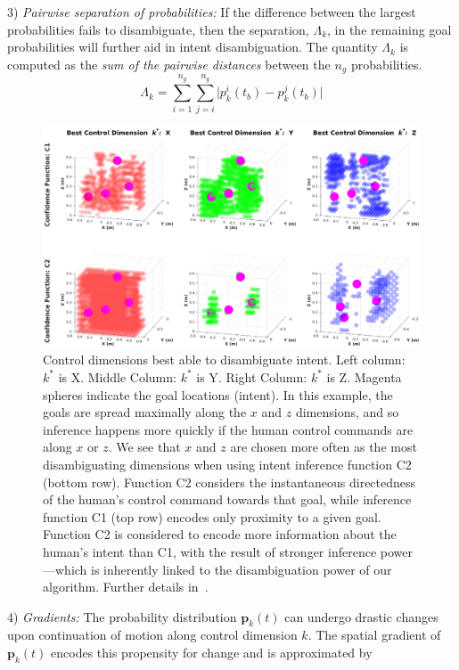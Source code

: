 3) \textit{Pairwise separation of probabilities:} If the difference between the largest probabilities fails to disambiguate, then the separation, $\Lambda_k$, in the remaining goal probabilities will further aid in intent disambiguation. The quantity $\Lambda_k$ is computed as the \textit{sum of the pairwise distances} between the $n_g$ probabilities.
\begin{equation}
\Lambda_k = \sum_{i=1}^{n_g}\sum_{j=i}^{n_g}\lvert p^i_k(t_b) - p^j_k(t_b)\rvert
\end{equation}
\begin{figure}[t]
	\centering
	\includegraphics[width = 1.15\hsize, height = 0.6\vsize, center]{./figures/sim_res.eps}
	\caption{Control dimensions best able to disambiguate intent.  Left column: $k^*$ is X. Middle Column: $k^*$ is Y. Right Column: $k^*$ is Z. Magenta spheres indicate the goal locations (intent). In this example, the goals are spread maximally along the $x$ and $z$ dimensions, and so inference happens more quickly if the human control commands are along $x$ or $z$. We see that $x$ and $z$ are chosen more often as the most disambiguating dimensions when using intent inference function C2 (bottom row). Function C2 considers the instantaneous directedness of the human's control command towards that goal, while inference function C1 (top row) encodes only proximity to a given goal. Function C2 is considered to encode more information about the human's intent than C1, with the result of stronger inference power---which is inherently linked to the disambiguation power of our algorithm. Further details in~\cite{gopinath2017mode}.}
	\label{fig:sim_res}
\end{figure}
4) \textit{Gradients:} The probability distribution $\boldsymbol{p}_k(t)$ can undergo drastic changes upon continuation of motion along control dimension $k$. The spatial gradient of $\boldsymbol{p}_k(t)$ encodes this propensity for change and is approximated by 
